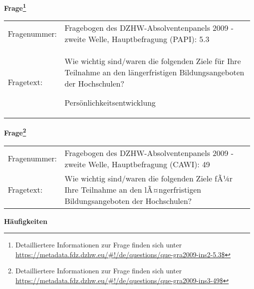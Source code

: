 				\vspace*{0.5cm}
                \noindent\textbf{Frage\footnote{Detailliertere Informationen zur Frage finden sich unter
		              \url{https://metadata.fdz.dzhw.eu/\#!/de/questions/que-gra2009-ins2-5.3$}}}\\
				\begin{tabularx}{\hsize}{@{}lX}
					Fragenummer: &
					  Fragebogen des DZHW-Absolventenpanels 2009 - zweite Welle, Hauptbefragung (PAPI):
					  5.3
 \\
					Fragetext: & Wie wichtig sind/waren die folgenden Ziele für Ihre Teilnahme an den längerfristigen Bildungsangeboten der Hochschulen?\par  Persönlichkeitsentwicklung \\
				\end{tabularx}
				\vspace*{0.5cm}
                \noindent\textbf{Frage\footnote{Detailliertere Informationen zur Frage finden sich unter
		              \url{https://metadata.fdz.dzhw.eu/\#!/de/questions/que-gra2009-ins3-49$}}}\\
				\begin{tabularx}{\hsize}{@{}lX}
					Fragenummer: &
					  Fragebogen des DZHW-Absolventenpanels 2009 - zweite Welle, Hauptbefragung (CAWI):
					  49
 \\
					Fragetext: & Wie wichtig sind/waren die folgenden Ziele fÃ¼r Ihre Teilnahme an den lÃ¤ngerfristigen Bildungsangeboten der Hochschulen? \\
				\end{tabularx}





        		\vspace*{0.5cm}
                \noindent\textbf{Häufigkeiten}


